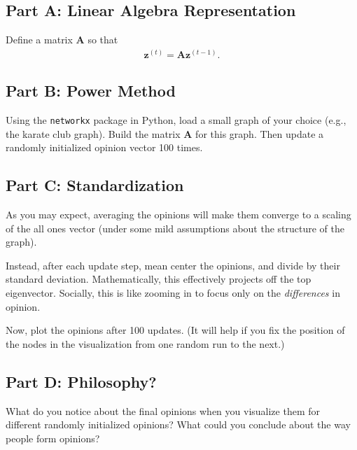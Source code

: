 \documentclass{article}
\begin{document}
\subsection*{Part A: Linear Algebra Representation}

Define a matrix $\mathbf{A}$ so that 
\begin{align*}
    \mathbf{z}^{(t)} = \mathbf{A} \mathbf{z}^{(t-1)}.
\end{align*}

\subsection*{Part B: Power Method}

Using the \texttt{networkx} package in Python, load a small graph of your choice (e.g., the karate club graph). Build the matrix $\mathbf{A}$ for this graph. Then update a randomly initialized opinion vector 100 times.

\subsection*{Part C: Standardization}

As you may expect, averaging the opinions will make them converge to a scaling of the all ones vector (under some mild assumptions about the structure of the graph).

Instead, after each update step, mean center the opinions, and divide by their standard deviation.
Mathematically, this effectively projects off the top eigenvector.
Socially, this is like zooming in to focus only on the \textit{differences} in opinion.

Now, plot the opinions after 100 updates.
(It will help if you fix the position of the nodes in the visualization from one random run to the next.)

\subsection*{Part D: Philosophy?}

What do you notice about the final opinions when you visualize them for different randomly initialized opinions?
What could you conclude about the way people form opinions?

%
\end{document}
